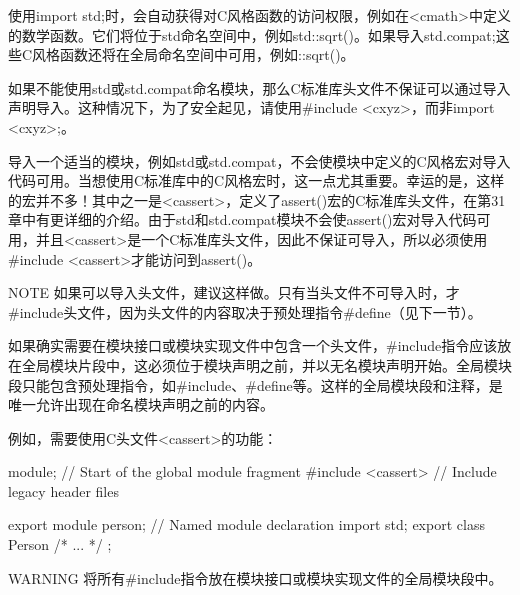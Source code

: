 使用import std;时，会自动获得对C风格函数的访问权限，例如在<cmath>中定义的数学函数。它们将位于std命名空间中，例如std::sqrt()。如果导入std.compat;这些C风格函数还将在全局命名空间中可用，例如::sqrt()。

如果不能使用std或std.compat命名模块，那么C标准库头文件不保证可以通过导入声明导入。这种情况下，为了安全起见，请使用\#include <cxyz>，而非import <cxyz>;。

导入一个适当的模块，例如std或std.compat，不会使模块中定义的C风格宏对导入代码可用。当想使用C标准库中的C风格宏时，这一点尤其重要。幸运的是，这样的宏并不多！其中之一是<cassert>，定义了assert()宏的C标准库头文件，在第31章中有更详细的介绍。由于std和std.compat模块不会使assert()宏对导入代码可用，并且<cassert>是一个C标准库头文件，因此不保证可导入，所以必须使用\#include <cassert>才能访问到assert()。

\begin{myNotic}{NOTE}
如果可以导入头文件，建议这样做。只有当头文件不可导入时，才\#include头文件，因为头文件的内容取决于预处理指令\#define（见下一节）。
\end{myNotic}

如果确实需要在模块接口或模块实现文件中包含一个头文件，\#include指令应该放在全局模块片段中，这必须位于模块声明之前，并以无名模块声明开始。全局模块段只能包含预处理指令，如\#include、\#define等。这样的全局模块段和注释，是唯一允许出现在命名模块声明之前的内容。

例如，需要使用C头文件<cassert>的功能：

\begin{cpp}
module; // Start of the global module fragment
#include <cassert> // Include legacy header files

export module person; // Named module declaration
import std;
export class Person { /* ... */ };
\end{cpp}

\begin{myWarning}{WARNING}
将所有\#include指令放在模块接口或模块实现文件的全局模块段中。
\end{myWarning}











